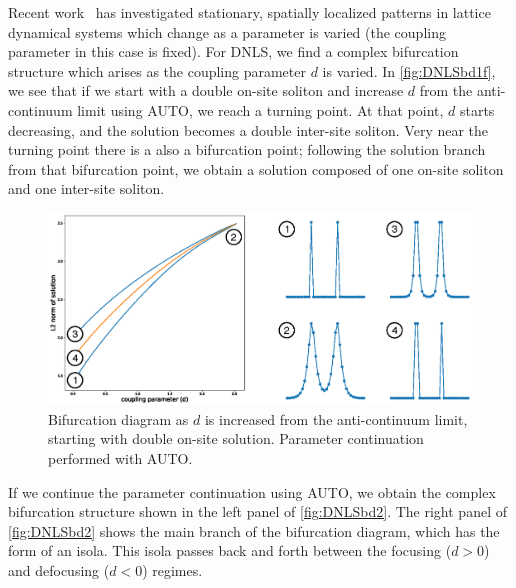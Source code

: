 \documentclass[thesis2.tex]{subfiles}
\begin{document}
Recent work~\cite{Jason2019} has investigated stationary, spatially localized patterns in lattice dynamical systems which change as a parameter is varied (the coupling parameter in this case is fixed). For DNLS, we find a  complex bifurcation structure which arises as the coupling parameter $d$ is varied. In \cref{fig:DNLSbd1f}, we see that if we start with a double on-site soliton and increase $d$ from the anti-continuum limit using AUTO, we reach a turning point. At that point, $d$ starts decreasing, and the solution becomes a double inter-site soliton. Very near the turning point there is a also a bifurcation point; following the solution branch from that bifurcation point, we obtain a solution composed of one on-site soliton and one inter-site soliton. 
\begin{figure}
\begin{center}
\includegraphics[width=14cm]{images/dnls/bd1.eps}
\end{center}
\caption[Bifurcation diagram in DNLS for increasing $d$]{Bifurcation diagram as $d$ is increased from the anti-continuum limit, starting with double on-site solution. Parameter continuation performed with AUTO.}
\label{fig:DNLSbd1}
\end{figure}
If we continue the parameter continuation using AUTO, we obtain the complex bifurcation structure shown in the left panel of \cref{fig:DNLSbd2}. The right panel of \cref{fig:DNLSbd2} shows the main branch of the bifurcation diagram, which has the form of an isola. This isola passes back and forth between the focusing ($d > 0$) and defocusing ($d < 0$) regimes.
\end{document}
